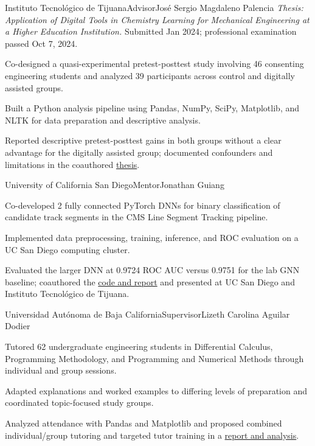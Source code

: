 \documentclass[10pt,letterpaper]{article}
\begin{document}
  {Instituto Tecnol\'ogico de Tijuana}{Advisor}{Jos\'e Sergio Magdaleno Palencia}
\textit{Thesis: Application of Digital Tools in Chemistry Learning for Mechanical Engineering at a Higher Education Institution.} Submitted Jan 2024; professional examination passed Oct 7, 2024.\par
\begin{cvitems}
  \item Co-designed a quasi-experimental pretest-posttest study involving 46 consenting engineering students and analyzed 39 participants across control and digitally assisted groups.
  \item Built a Python analysis pipeline using Pandas, NumPy, SciPy, Matplotlib, and NLTK for data preparation and descriptive analysis.
  \item Reported descriptive pretest-posttest gains in both groups without a clear advantage for the digitally assisted group; documented confounders and limitations in the coauthored \href{https://github.com/NotsoJharedtrollOx17/Residencia_ITT}{thesis}.
\end{cvitems}

  {University of California San Diego}{Mentor}{Jonathan Guiang}
\begin{cvitems}
  \item Co-developed 2 fully connected PyTorch DNNs for binary classification of candidate track segments in the CMS Line Segment Tracking pipeline.
  \item Implemented data preprocessing, training, inference, and ROC evaluation on a UC San Diego computing cluster.
  \item Evaluated the larger DNN at 0.9724 ROC AUC versus 0.9751 for the lab GNN baseline; coauthored the \href{https://github.com/NotsoJharedtrollOx17/Using_ML_for_Particle_Tracking_at_LHC}{code and report} and presented at UC San Diego and Instituto Tecnol\'ogico de Tijuana.
\end{cvitems}

  {Universidad Aut\'onoma de Baja California}{Supervisor}{Lizeth Carolina Aguilar Dodier}
\begin{cvitems}
  \item Tutored 62 undergraduate engineering students in Differential Calculus, Programming Methodology, and Programming and Numerical Methods through individual and group sessions.
  \item Adapted explanations and worked examples to differing levels of preparation and coordinated topic-focused study groups.
  \item Analyzed attendance with Pandas and Matplotlib and proposed combined individual/group tutoring and targeted tutor training in a \href{https://github.com/NotsoJharedtrollOx17/ServicioSocial_ITT}{report and analysis}.
\end{cvitems}
\end{document}
